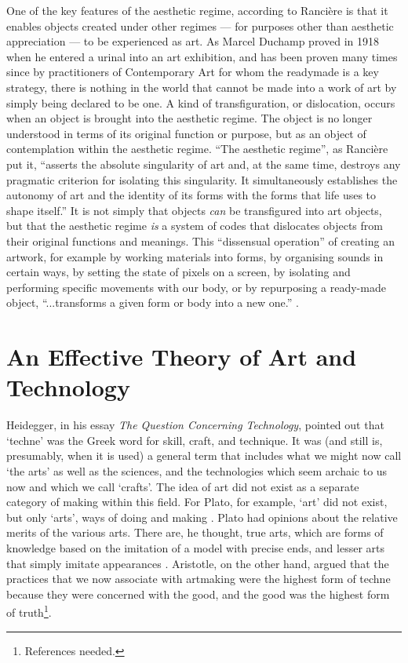 \documentclass[letterpaper]{article}
\begin{document}
    One of the key features of the aesthetic regime, according to Rancière is that it enables objects created under other regimes — for purposes other than aesthetic appreciation — to be experienced as art. As Marcel Duchamp proved in 1918 when he entered a urinal into an art exhibition, and has been proven many times since by practitioners of Contemporary Art for whom the readymade is a key strategy, there is nothing in the world that cannot be made into a work of art by simply being declared to be one. A kind of transfiguration, or dislocation, occurs when an object is brought into the aesthetic regime. The object is no longer understood in terms of its original function or purpose, but as an object of contemplation within the aesthetic regime. “The aesthetic regime”, as Rancière put it, “asserts the absolute singularity of art and, at the same time, destroys any pragmatic criterion for isolating this singularity. It simultaneously establishes the autonomy of art and the identity of its forms with the forms that life uses to shape itself.” It is not simply that objects \emph{can} be transfigured into art objects, but that the aesthetic regime \emph{is} a system of codes that dislocates objects from their original functions and meanings. This “dissensual operation” of creating an artwork, for example by working materials into forms, by organising sounds in certain ways, by setting the state of pixels on a screen, by isolating and performing specific movements with our body, or by repurposing a ready-made object, “...transforms a given form or body into a new one.” \citep[p.54]{RancierThEmncptdSpcttr2009}.

\section{An Effective Theory of Art and Technology}

    Heidegger, in his essay \emph{The Question Concerning Technology}, pointed out that ‘techne’ was the Greek word for skill, craft, and technique. It was (and still is, presumably, when it is used) a general term that includes what we might now call ‘the arts’ as well as the sciences, and the technologies which seem archaic to us now and which we call ‘crafts’. The idea of art did not exist as a separate category of making within this field. For Plato, for example, ‘art’ did not exist, but only ‘arts’, ways of doing and making \citep[p.20]{RancierPltcsOfThAsthtcs2004}. Plato had opinions about the relative merits of the various arts. There are, he thought, true arts, which are forms of knowledge based on the imitation of a model with precise ends, and lesser arts that simply imitate appearances \citep[p.20]{RancierPltcsOfThAsthtcs2004}. Aristotle, on the other hand, argued that the practices that we now associate with artmaking were the highest form of techne because they were concerned with the good, and the good was the highest form of truth\footnote{References needed.}.
\end{document}

